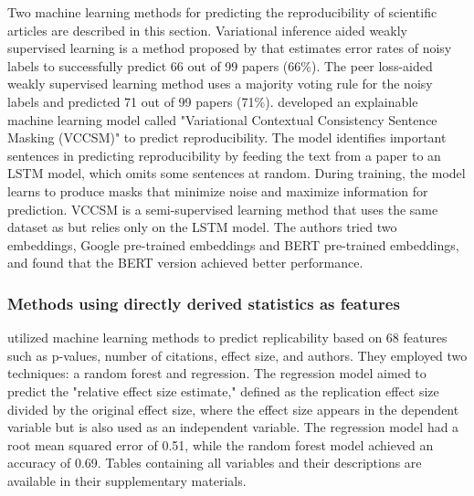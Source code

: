 \documentclass[12pt, a4paper, twocolumn]{article}
\begin{document}


			Two machine learning methods for predicting the reproducibility of scientific articles are described in this section. Variational inference aided weakly supervised learning is a method proposed by \citet{Luo2022sentence} that estimates error rates of noisy labels to successfully predict 66 out of 99 papers (66\%). The peer loss-aided weakly supervised learning method uses a majority voting rule for the noisy labels and predicted 71 out of 99 papers (71\%). \citet{Luo2022sentence} developed an explainable machine learning model called "Variational Contextual Consistency Sentence Masking (VCCSM)" to predict reproducibility. The model identifies important sentences in predicting reproducibility by feeding the text from a paper to an LSTM model, which omits some sentences at random. During training, the model learns to produce masks that minimize noise and maximize information for prediction. VCCSM is a semi-supervised learning method that uses the same dataset as \citet{Luo2022sentence} but relies only on the LSTM model. The authors tried two embeddings, Google pre-trained embeddings and BERT pre-trained embeddings, and found that the BERT version achieved better performance.
			

			\subsubsection{Methods using directly derived statistics as features}
			\citet{Altmejd2019predicting} utilized machine learning methods to predict replicability based on 68 features such as p-values, number of citations, effect size, and authors. They employed two techniques: a random forest and regression. The regression model aimed to predict the "relative effect size estimate," defined as the replication effect size divided by the original effect size, where the effect size appears in the dependent variable but is also used as an independent variable. The regression model had a root mean squared error of 0.51, while the random forest model achieved an accuracy of 0.69. Tables containing all variables and their descriptions are available in their supplementary materials.
			
\end{document}
